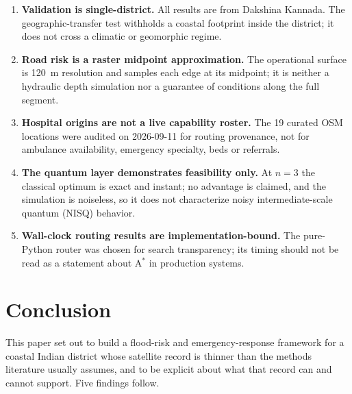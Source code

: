\documentclass[10pt,twocolumn]{article}
\begin{document}
\begin{enumerate}
\item \textbf{Validation is single-district.} All results are from Dakshina
      Kannada. The geographic-transfer test withholds a coastal footprint inside
      the district; it does not cross a climatic or geomorphic regime.
\item \textbf{Road risk is a raster midpoint approximation.} The operational
      surface is \SI{120}{\metre} resolution and samples each edge at its
      midpoint; it is neither a hydraulic depth simulation nor a guarantee of
      conditions along the full segment.
\item \textbf{Hospital origins are not a live capability roster.} The 19
      curated OSM locations were audited on 2026-09-11 for routing provenance,
      not for ambulance availability, emergency specialty, beds or referrals.
\item \textbf{The quantum layer demonstrates feasibility only.} At $n=3$ the
      classical optimum is exact and instant; no advantage is claimed, and the
      simulation is noiseless, so it does not characterize noisy intermediate-scale quantum (NISQ) behavior.
\item \textbf{Wall-clock routing results are implementation-bound.} The
      pure-Python router was chosen for search transparency; its timing should
      not be read as a statement about A$^\ast$ in production systems.
\end{enumerate}

\section{Conclusion}
\label{sec:conclusions}

This paper set out to build a flood-risk and emergency-response framework for a
coastal Indian district whose satellite record is thinner than the methods
literature usually assumes, and to be explicit about what that record can and
cannot support. Five findings follow.
\end{document}
